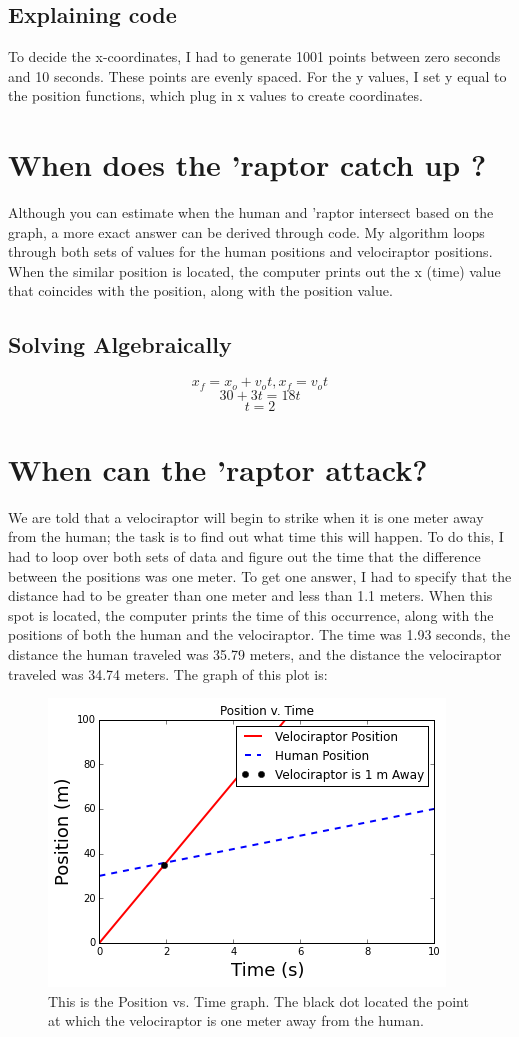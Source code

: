 \documentclass[twocolumn]{revtex4}
\begin{document}
\subsection{Explaining code}
To decide the x-coordinates, I had to generate 1001 points between zero seconds and 10 seconds.  These points are evenly spaced.  For the y values, I set y equal to the position functions, which plug in x values to create coordinates.  

\section{When does the 'raptor catch up ?}
Although you can estimate when the human and 'raptor intersect based on the graph, a more exact answer can be derived through code.  My algorithm loops through both sets of values for the human positions and velociraptor positions.  When the similar position is located, the computer prints out the x (time) value that coincides with the position, along with the position value.  

\subsection{Solving Algebraically}
$$ x_f = x_o + v_ot , x_f = v_ot $$ 
$$ 30 + 3t = 18t $$ 
$$ t = 2 $$

\section{When can the 'raptor attack?}
We are told that a velociraptor will begin to strike when it is one meter away from the human;  the task is to find out what time this will happen.  To do this, I had to loop over both sets of data and figure out the time that the difference between the positions was one meter.  To get one answer, I had to specify that the distance had to be greater than one meter and less than 1.1 meters.  When this spot is located, the computer prints the time of this occurrence, along with the positions of both the human and the velociraptor. The time was 1.93 seconds, the distance the human traveled was 35.79 meters, and the distance the velociraptor traveled was 34.74 meters.  The graph of this plot is: 

\begin{figure}[h!]
	\centering
	\includegraphics[width = .5\textwidth]{p v t graph 2.png}
	\caption{This is the Position vs. Time graph.  The black dot located the point at which the velociraptor is one meter away from the human.  \label{ptoe2}}
\end{figure}
\end{document}
